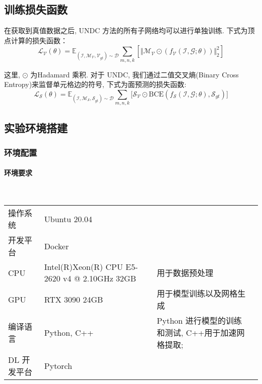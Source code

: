 \subsection{训练损失函数}
在获取到真值数据之后, UNDC 方法的所有子网络均可以进行单独训练. 下式为顶点计算的损失函数：
\begin{equation}
\mathcal{L_V}(\theta)=\mathbb{E}_{(\mathcal{I, M_V, V}_{gt})\sim \mathcal{D}}\sum _{m,n,k} [ \Vert \mathcal{M_V} \odot (f_{\mathcal{V}}(\mathcal{I,G};\theta)) \Vert ^2_2 ]
\end{equation}

这里, $\odot$ 为Hadamard 乘积. 对于 UNDC, 我们通过二值交叉熵(Binary Cross Entropy)来监督单元格边的符号, 下式为面预测的损失函数:
\begin{equation}
\mathcal{L_S}(\theta)=\mathbb{E}_{(\mathcal{I, M_S, S}_{gt})\sim \mathcal{D}}\sum_{m,n,k} \lbrack \mathcal{S_V} \odot \mathrm{BCE}(f_\mathcal{S}(\mathcal{I,G};\theta), \mathcal{S}_{gt}) \rbrack
\end{equation}

\subsection{实验环境搭建}
\subsubsection{环境配置}
\paragraph{环境要求}~{}

\begin{table}[h]
    \centering
    \begin{tabularx}{\textwidth}{X X X X}
		操作系统 & Ubuntu 20.04 & \\
		开发平台 & Docker & \\
		CPU & Intel(R)Xeon(R) CPU E5-2620 v4 @ 2.10GHz 32GB & 用于数据预处理 \\
		GPU & RTX 3090 24GB & 用于模型训练以及网格生成 \\
		编译语言 & Python, C++ & Python 进行模型的训练和测试, C++用于加速网格提取; \\
		DL 开发平台 & Pytorch & \\
    \end{tabularx}
\end{table}


